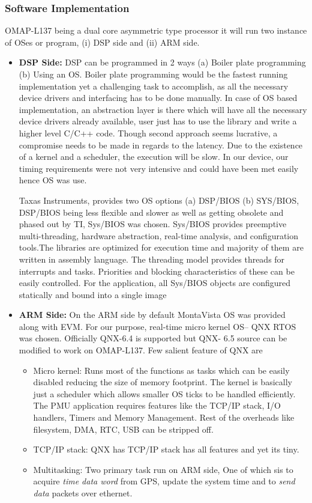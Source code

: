 \begin{appendix}
\subsubsection{Software Implementation}
OMAP-L137 being a dual core asymmetric type processor it will run two instance of OSes or program, (i) DSP side and (ii) ARM side.  

\begin{itemize}
	\item \textbf{DSP Side:}
	DSP can be programmed in 2 ways (a) Boiler plate programming (b) Using an OS. Boiler plate programming would be the fastest running implementation yet a challenging task to accomplish, as all the necessary device drivers and interfacing has to be done manually. In case of OS based implementation, an abstraction layer is there which will have all the necessary device drivers already available, user just has to use the library and write a higher level C/C++ code. Though second approach seems lucrative, a compromise needs to be made in regards to the latency. Due to the existence of a kernel and a scheduler, the execution will be slow. In our device, our timing requirements were not very intensive and could have been met easily hence OS was use.
	
	Taxas Instruments, provides two OS options (a) DSP/BIOS (b) SYS/BIOS, DSP/BIOS being less flexible and slower as well as getting obsolete and phased out by TI, Sys/BIOS was chosen. Sys/BIOS provides preemptive multi-threading, hardware abstraction, real-time analysis, and configuration tools.The libraries are optimized for execution time and majority of them are written in assembly	language. The threading model provides threads for interrupts and tasks. Priorities and blocking characteristics of these can be easily controlled. For the application, all Sys/BIOS objects are configured statically and bound into a single image
	
	\item \textbf{ARM Side:} On the ARM side by default MontaVista OS was provided along with EVM. For our purpose, real-time micro kernel OS-- QNX RTOS was chosen. Officially QNX-6.4 is supported but QNX- 6.5 source can be modified to work on OMAP-L137. Few salient feature of QNX are 
	\begin{itemize}
		\item Micro kernel: Runs most of the functions as tasks which can be easily disabled reducing the size of memory footprint. The kernel is basically just a scheduler which allows smaller OS ticks to be handled efficiently. The PMU application requires features like the TCP/IP stack, I/O handlers, Timers and Memory Management. Rest of the overheads like filesystem, DMA, RTC, USB can be stripped off.
		\item TCP/IP stack: QNX has TCP/IP stack has all features and yet its tiny.
		\item  Multitasking: Two primary task run on ARM side, One of which sis to acquire \emph{time data word} from GPS, update the system time and to \emph{send data} packets over ethernet.
	\end{itemize}


\end{itemize}
\end{appendix}

